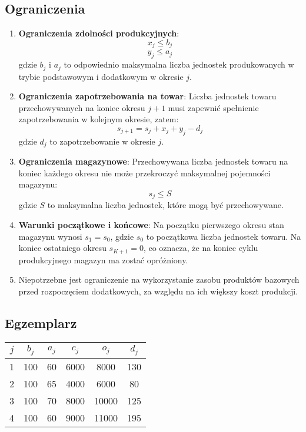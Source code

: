 \documentclass[12pt, letterpaper]{article}
\begin{document}
\subsection{Ograniczenia}
\begin{enumerate}
  \item \textbf{Ograniczenia zdolności produkcyjnych}:
        \[
          x_j \leq b_j
        \]
        \[
          y_j \leq a_j
        \]
        gdzie \( b_j \) i \( a_j \) to odpowiednio maksymalna liczba jednostek
        produkowanych w trybie podstawowym i dodatkowym w okresie \( j \).

  \item \textbf{Ograniczenia zapotrzebowania na towar}:
        Liczba jednostek towaru przechowywanych na koniec okresu \( j+1 \) musi
        zapewnić spełnienie zapotrzebowania w kolejnym okresie, zatem:
        \[
          s_{j+1} = s_j + x_j + y_j - d_j
        \]
        gdzie \( d_j \) to zapotrzebowanie w okresie \( j \).

  \item \textbf{Ograniczenia magazynowe}:
        Przechowywana liczba jednostek towaru na koniec każdego okresu nie może
        przekroczyć maksymalnej pojemności magazynu:
        \[
          s_j \leq S
        \]
        gdzie \( S \) to maksymalna liczba jednostek, które mogą być
        przechowywane.

  \item \textbf{Warunki początkowe i końcowe}:
        Na początku pierwszego okresu stan magazynu wynosi \( s_1 = s_0 \),
        gdzie \( s_0 \) to początkowa liczba jednostek towaru. Na koniec
        ostatniego
        okresu \( s_{K+1} = 0 \), co oznacza, że na koniec cyklu produkcyjnego
        magazyn
        ma zostać opróżniony.

  \item Niepotrzebne jest ograniczenie na wykorzystanie zasobu produktów
        bazowych przed rozpoczęciem dodatkowych,
        za względu na ich większy koszt produkcji.
\end{enumerate}

\subsection{Egzemplarz}

\begin{center}
  \begin{tabular}{|c|c|c|c|c|c|}
    \hline
    \( j \) & \( b_j \) & \( a_j \) & \( c_j \) & \( o_j \) & \( d_j \) \\
    \hline
    1       & 100       & 60        & 6000      & 8000      & 130       \\
    2       & 100       & 65        & 4000      & 6000      & 80        \\
    3       & 100       & 70        & 8000      & 10000     & 125       \\
    4       & 100       & 60        & 9000      & 11000     & 195       \\
    \hline
  \end{tabular}
\end{center}
\end{document}
